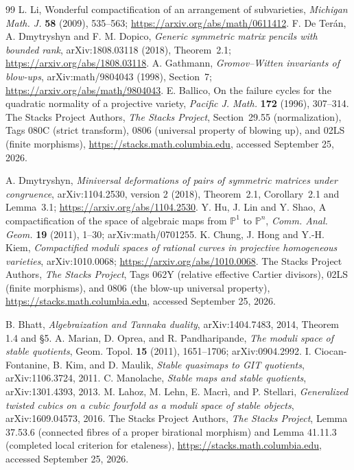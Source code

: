 \documentclass[11pt,reqno]{amsart}
\numberwithin{equation}{section}
\theoremstyle{definition}\newtheorem{definition}[theorem]{Definition}
\theoremstyle{remark}\newtheorem{remark}[theorem]{Remark}
\newcommand{\Pj}{\mathbb P}\newcommand{\A}{\mathbb A}
\begin{document}
\begin{thebibliography}{99}
L. Li, Wonderful compactification of an arrangement of subvarieties,
\emph{Michigan Math. J.} \textbf{58} (2009), 535--563;
\url{https://arxiv.org/abs/math/0611412}.
F. De Ter\'an, A. Dmytryshyn and F. M. Dopico,
\emph{Generic symmetric matrix pencils with bounded rank},
arXiv:1808.03118 (2018), Theorem~2.1;
\url{https://arxiv.org/abs/1808.03118}.
A. Gathmann, \emph{Gromov--Witten invariants of blow-ups},
arXiv:math/9804043 (1998), Section~7;
\url{https://arxiv.org/abs/math/9804043}.
E. Ballico, On the failure cycles for the quadratic normality of a
projective variety, \emph{Pacific J. Math.} \textbf{172} (1996),
307--314.
The Stacks Project Authors, \emph{The Stacks Project},
Section~29.55 (normalization), Tags 080C (strict transform),
0806 (universal property of blowing up), and 02LS (finite morphisms),
\url{https://stacks.math.columbia.edu}, accessed September 25, 2026.

A. Dmytryshyn, \emph{Miniversal deformations of pairs of symmetric
matrices under congruence}, arXiv:1104.2530, version 2 (2018),
Theorem~2.1, Corollary~2.1 and Lemma~3.1;
\url{https://arxiv.org/abs/1104.2530}.
Y. Hu, J. Lin and Y. Shao, A compactification of the space of algebraic
maps from $\Pj^1$ to $\Pj^n$, \emph{Comm. Anal. Geom.}
\textbf{19} (2011), 1--30; arXiv:math/0701255.
K. Chung, J. Hong and Y.-H. Kiem, \emph{Compactified moduli spaces
of rational curves in projective homogeneous varieties},
arXiv:1010.0068; \url{https://arxiv.org/abs/1010.0068}.
The Stacks Project Authors, \emph{The Stacks Project},
Tags 062Y (relative effective Cartier divisors), 02LS (finite morphisms),
and 0806 (the blow-up universal property),
\url{https://stacks.math.columbia.edu}, accessed September 25, 2026.

B. Bhatt, \emph{Algebraization and Tannaka duality},
arXiv:1404.7483, 2014, Theorem 1.4 and \S5.
A. Marian, D. Oprea, and R. Pandharipande,
\emph{The moduli space of stable quotients}, Geom. Topol.
\textbf{15} (2011), 1651--1706; arXiv:0904.2992.
I. Ciocan-Fontanine, B. Kim, and D. Maulik,
\emph{Stable quasimaps to GIT quotients}, arXiv:1106.3724, 2011.
C. Manolache, \emph{Stable maps and stable quotients},
arXiv:1301.4393, 2013.
M. Lahoz, M. Lehn, E. Macr\`i, and P. Stellari,
\emph{Generalized twisted cubics on a cubic fourfold as a moduli
space of stable objects}, arXiv:1609.04573, 2016.
The Stacks Project Authors, \emph{The Stacks Project},
Lemma 37.53.6 (connected fibres of a proper birational morphism)
and Lemma 41.11.3 (completed local criterion for etaleness),
\url{https://stacks.math.columbia.edu}, accessed September 25, 2026.


\end{thebibliography}
\end{document}

